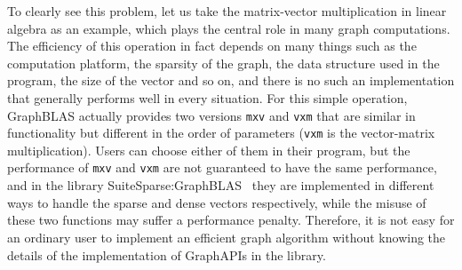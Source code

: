 \documentclass{sokendai_thesis} %
\begin{document}
To clearly see this problem, let us take the matrix-vector multiplication in linear algebra as an example, which plays the central role in many graph computations.
The efficiency of this operation in fact depends on many things such as the computation platform, the sparsity of the graph, the data structure used in the program, the size of the vector and so on, and there is no such an implementation that generally performs well in every situation.
For this simple operation, GraphBLAS actually provides two versions \texttt{mxv} and \texttt{vxm} that are similar in functionality but different in the order of parameters (\texttt{vxm} is the vector-matrix multiplication).
Users can choose either of them in their program, but the performance of \texttt{mxv} and \texttt{vxm} are not guaranteed to have the same performance, and in the library SuiteSparse:GraphBLAS~\cite{suitesparse} they are implemented in different ways to handle the sparse and dense vectors respectively, while the misuse of these two functions may suffer a performance penalty.
Therefore, it is not easy for an ordinary user to implement an efficient graph algorithm without knowing the details of the implementation of GraphAPIs in the library.
\end{document}
